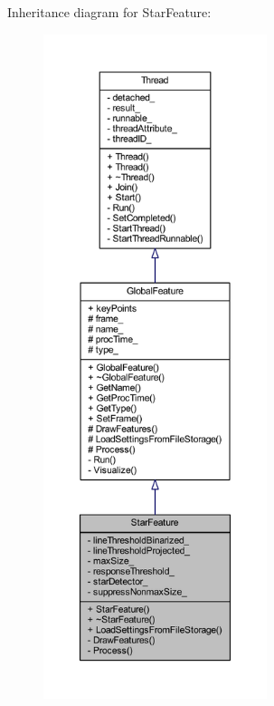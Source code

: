 Inheritance diagram for Star\-Feature\-:
\nopagebreak
\begin{figure}[H]
\begin{center}
\leavevmode
\includegraphics[height=550pt]{class_star_feature__inherit__graph}
\end{center}
\end{figure}


